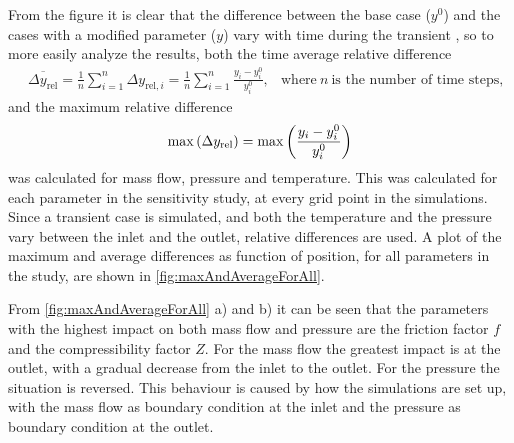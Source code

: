 From the figure it is clear that the difference between the base case ($y^{0}$) and the cases with a modified parameter ($y$) vary with time during the transient%
, so to more easily analyze the results, both the time average relative difference
\begin{align}
    &\overbar{\Delta y_\mathrm{rel}}
    = \frac{1}{n} \sum_{i=1}^n \Delta y_{\mathrm{rel}, i}
    = \frac{1}{n} \sum_{i=1}^n \frac{y_i - y_i^0}{y_i^0},
    &\text{where}~n~\text{is the number of time steps,}
\end{align}
and the maximum relative difference
\begin{align}
    \max\del{\Delta y_\mathrm{rel}} = \max\del{\frac{y_i - y_i^0}{y_i^0}}
\end{align}
was calculated for mass flow, pressure and temperature. %
This was calculated for each parameter in the sensitivity study, at every grid point in the simulations. Since a transient case is simulated, and both the temperature and the pressure vary between the inlet and the outlet, relative differences are used. %
%
%
A plot of the maximum and average differences as function of position, for all parameters in the study, are shown in \cref{fig:maxAndAverageForAll}.%

From \cref{fig:maxAndAverageForAll} a) and b) it can be seen that the parameters with the highest impact on both mass flow and pressure are the friction factor $f$ and the compressibility factor $Z$. For the mass flow the greatest impact is at the outlet, with a gradual decrease from the inlet to the outlet. For the pressure the situation is reversed. This behaviour is caused by how the simulations are set up, with the mass flow as boundary condition at the inlet and the pressure as boundary condition at the outlet.

